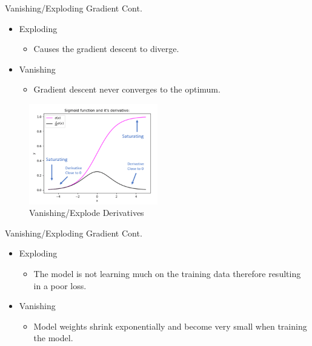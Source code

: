 \begin{frame}{Vanishing/Exploding Gradient Cont.}
    \begin{itemize}
        \item Exploding
        \begin{itemize}
            \item Causes the gradient descent to diverge. 
        \end{itemize}
        \item Vanishing
        \begin{itemize}
            \item Gradient descent never converges to the optimum. 
        \end{itemize}
    \end{itemize}
    \begin{figure}[H]
    		\centering
    		\includegraphics[width=0.5\textwidth]{Figs/van_1.png}
    		\caption{Vanishing/Explode Derivatives}
	    \end{figure}
\end{frame}

\begin{frame}{Vanishing/Exploding Gradient Cont.}
    \begin{itemize}
        \item Exploding
        \begin{itemize}
            \item The model is not learning much on the training data therefore resulting in a poor loss.
        \end{itemize}
        \item Vanishing
        \begin{itemize}
            \item Model weights shrink exponentially and become very small when training the model.
        \end{itemize}
    \end{itemize}
\end{frame}

